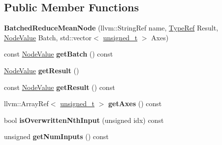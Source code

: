 \subsection*{Public Member Functions}
\begin{DoxyCompactItemize}
\item 
\mbox{\label{classglow_1_1_batched_reduce_mean_node_a9edb19e8aed83cfc6bc850da0181076f}} 
{\bfseries Batched\+Reduce\+Mean\+Node} (llvm\+::\+String\+Ref name, \hyperlink{structglow_1_1_type}{Type\+Ref} Result, \hyperlink{structglow_1_1_node_value}{Node\+Value} Batch, std\+::vector$<$ \hyperlink{namespaceglow_a0ca574644e1e42ef193a9947fb4d8911}{unsigned\+\_\+t} $>$ Axes)
\item 
\mbox{\label{classglow_1_1_batched_reduce_mean_node_ab06bd2ddf6f036754a5b137753e17924}} 
const \hyperlink{structglow_1_1_node_value}{Node\+Value} {\bfseries get\+Batch} () const
\item 
\mbox{\label{classglow_1_1_batched_reduce_mean_node_aefce64a4e1f07e88e746cdf39a0617b5}} 
\hyperlink{structglow_1_1_node_value}{Node\+Value} {\bfseries get\+Result} ()
\item 
\mbox{\label{classglow_1_1_batched_reduce_mean_node_ab0bda42b0ec8d6c449d83256b80628a1}} 
const \hyperlink{structglow_1_1_node_value}{Node\+Value} {\bfseries get\+Result} () const
\item 
\mbox{\label{classglow_1_1_batched_reduce_mean_node_a9187dd6606f69167a9c740cd660b2ad9}} 
llvm\+::\+Array\+Ref$<$ \hyperlink{namespaceglow_a0ca574644e1e42ef193a9947fb4d8911}{unsigned\+\_\+t} $>$ {\bfseries get\+Axes} () const
\item 
\mbox{\label{classglow_1_1_batched_reduce_mean_node_a533074770dc5ee9c4944c00f494fb477}} 
bool {\bfseries is\+Overwritten\+Nth\+Input} (unsigned idx) const
\item 
\mbox{\label{classglow_1_1_batched_reduce_mean_node_a1601f2d20eb60e7e39fb961f5ef0565c}} 
unsigned {\bfseries get\+Num\+Inputs} () const

\end{DoxyCompactItemize}
